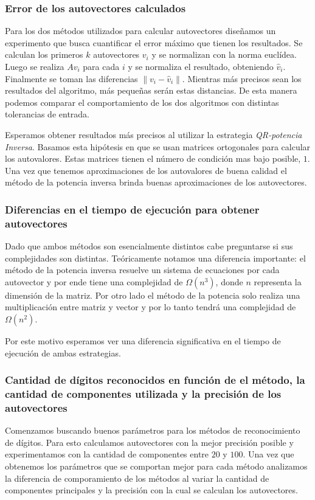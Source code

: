 	\subsubsection{Error de los autovectores calculados}
		Para los dos m\'etodos utilizados para calcular autovectores
		dise\~namos un experimento que busca cuantificar el error m\'aximo
		que tienen los resultados.
		Se calculan los primeros $k$ autovectores $v_i$ y se normalizan con la
		norma eucl\'idea. Luego se realiza $Av_i$ para cada $i$ y se normaliza
		el resultado, obteniendo $\hat{v}_i$. Finalmente se toman las diferencias
		$\|v_i-\hat{v}_i\|$. Mientras m\'as precisos sean los resultados del
		algoritmo, m\'as peque\~nas ser\'an estas distancias.
		De esta manera podemos comparar el comportamiento de los dos algoritmos
		con distintas tolerancias de entrada.
		
		Esperamos obtener resultados m\'as precisos al utilizar la estrategia
		\textit{QR-potencia Inversa}. Basamos esta hip\'otesis en que se usan
		matrices ortogonales para calcular los autovalores. Estas matrices
		tienen el n\'umero de condici\'on mas bajo posible, $1$.
		Una vez que tenemos aproximaciones de los autovalores de buena calidad
		el m\'etodo de la potencia inversa brinda buenas aproximaciones de los
		autovectores.

	\subsubsection{Diferencias en el tiempo de ejecuci\'on para obtener autovectores}
		Dado que ambos m\'etodos son esencialmente distintos cabe preguntarse
		si sus complejidades son distintas. Te\'oricamente notamos una diferencia
		importante: el m\'etodo de la potencia inversa resuelve un sistema de
		ecuaciones por cada autovector y por ende tiene una complejidad de $\Omega(n^3)$,
		donde $n$ representa la dimensi\'on de la matriz. Por otro lado el m\'etodo
		de la potencia solo realiza una multiplicaci\'on entre matriz y vector
		y por lo tanto tendr\'a una complejidad de $\Omega(n^2)$.

		Por este motivo esperamos ver una diferencia significativa en el tiempo de
		ejecuci\'on de ambas estrategias.

	\subsubsection{Cantidad de d\'igitos reconocidos en funci\'on de el m\'etodo,
	la cantidad de componentes utilizada y la precisi\'on de los autovectores}
		Comenzamos buscando buenos par\'ametros para los m\'etodos de reconocimiento
		de d\'igitos. Para esto calculamos autovectores con la mejor precisi\'on
		posible y experimentamos con la cantidad de componentes entre $20$ y $100$.
		Una vez que obtenemos los par\'ametros que se comportan mejor para cada
		m\'etodo analizamos la diferencia de comporamiento de los m\'etodos
		al variar la cantidad de componentes principales y la precisi\'on con
		la cual se calculan los autovectores.

